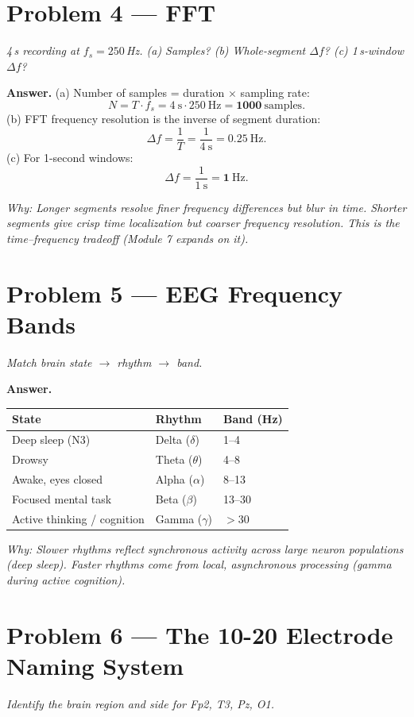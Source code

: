 \documentclass[11pt,letterpaper]{article}
\newcommand{\answer}[1]{%
\begin{tcolorbox}[colback=ansbg,colframe=accent!60,boxrule=0.4pt,arc=3pt,
  left=8pt,right=8pt,top=5pt,bottom=5pt]
\textbf{Answer.} #1
\end{tcolorbox}}
\newcommand{\why}[1]{\par\vspace{0.2em}\textit{Why: #1}}
\begin{document}
\section*{Problem 4 — FFT}
\textit{4\,s recording at $f_s = 250$\,Hz. (a) Samples? (b) Whole-segment $\Delta f$? (c) 1\,s-window $\Delta f$?}

\answer{(a) Number of samples = duration $\times$ sampling rate:
$$N = T \cdot f_s = 4\ \mathrm{s} \cdot 250\ \mathrm{Hz} = \mathbf{1000\ \mathrm{samples}}.$$
(b) FFT frequency resolution is the inverse of segment duration:
$$\Delta f = \frac{1}{T} = \frac{1}{4\ \mathrm{s}} = \mathbf{0.25\ \mathrm{Hz}}.$$
(c) For 1-second windows:
$$\Delta f = \frac{1}{1\ \mathrm{s}} = \mathbf{1\ \mathrm{Hz}}.$$}
\why{Longer segments resolve finer frequency differences but blur in time. Shorter segments give crisp time localization but coarser frequency resolution. This is the time--frequency tradeoff (Module 7 expands on it).}

\section*{Problem 5 — EEG Frequency Bands}
\textit{Match brain state $\to$ rhythm $\to$ band.}

\answer{
\begin{tabular}{lll}
\textbf{State} & \textbf{Rhythm} & \textbf{Band (Hz)} \\
\hline
\rule{0pt}{1.1em} Deep sleep (N3) & Delta ($\delta$) & 1--4 \\
Drowsy & Theta ($\theta$) & 4--8 \\
Awake, eyes closed & Alpha ($\alpha$) & 8--13 \\
Focused mental task & Beta ($\beta$) & 13--30 \\
Active thinking / cognition & Gamma ($\gamma$) & $>$30 \\
\hline
\end{tabular}}
\why{Slower rhythms reflect synchronous activity across large neuron populations (deep sleep). Faster rhythms come from local, asynchronous processing (gamma during active cognition).}

\section*{Problem 6 — The 10-20 Electrode Naming System}
\textit{Identify the brain region and side for Fp2, T3, Pz, O1.}
\end{document}
